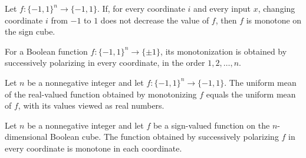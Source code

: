\begin{theorem}
\label{FABL.monotone_of_isMonotoneInCoordinate}
\leanok
{}
Let $f:\{-1,1\}^n\to\{-1,1\}$. If, for every coordinate $i$ and every input $x$,
changing coordinate $i$ from $-1$ to $1$ does not decrease the value of $f$, then $f$ is
monotone on the sign cube.
\end{theorem}

\begin{definition}
\label{FABL.monotonization}
\leanok
{}
For a Boolean function $f:\{-1,1\}^n\to\{\pm1\}$, its monotonization is obtained by
successively polarizing in every coordinate, in the order $1,2,\ldots,n$.
\end{definition}

\begin{theorem}
\label{FABL.mean_monotonization}
\leanok
{}
Let $n$ be a nonnegative integer and let $f:\{−1,1\}^n\to\{−1,1\}$. The uniform mean of
the real-valued function obtained by monotonizing $f$ equals the uniform mean of $f$,
with its values viewed as real numbers.
\end{theorem}

\begin{theorem}
\label{FABL.isMonotoneInCoordinate_monotonization}
\leanok
{}
Let $n$ be a nonnegative integer and let $f$ be a sign-valued function on the
$n$-dimensional Boolean cube. The function obtained by successively polarizing $f$ in
every coordinate is monotone in each coordinate.
\end{theorem}

